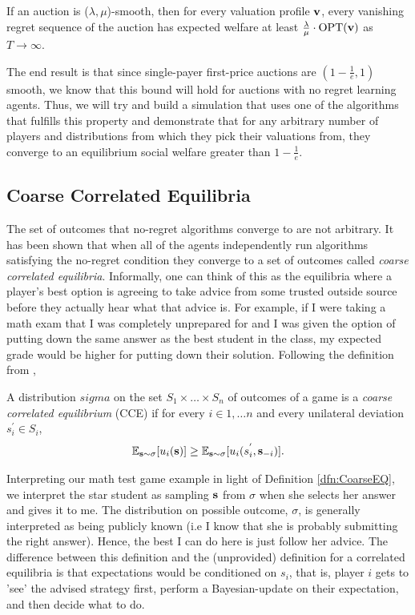\documentclass[12pt,twoside]{reedthesis}
\begin{document}
\begin{theorem}
	If an auction is ($\lambda, \mu$)-smooth, then for every valuation profile $\textbf{v}$, every vanishing regret sequence of the auction has expected welfare at least $\frac{\lambda}{\mu} \cdot \text{OPT}(\textbf{v})$ as $T \rightarrow \infty$. 
\end{theorem}

The end result is that since single-payer first-price auctions are $(1-\frac{1}{e}, 1)$ smooth, we know that this bound will hold for auctions with no regret learning agents. Thus, we will try and build a simulation that uses one of the algorithms that fulfills this property and demonstrate that for any arbitrary number of players and distributions from which they pick their valuations from, they converge to an equilibrium social welfare greater than $1-\frac{1}{e}$.

\label{sec:No-Regret-Learning}
\subsection{Coarse Correlated Equilibria}
The set of outcomes that no-regret algorithms converge to are not arbitrary. It has been shown that when all of the agents independently run algorithms satisfying the no-regret condition they converge to a set of outcomes called {\em coarse correlated equilibria}. Informally, one can think of this as the equilibria where a player's best option is agreeing to take advice from some trusted outside source before they actually hear what that advice is. For example, if I were taking a math exam that I was completely unprepared for and I was given the option of putting down the same answer as the best student in the class, my expected grade would be higher for putting down their solution. Following the definition from \cite{Roughgarden2016},
\begin{dfn}
	A distribution $sigma$ on the set $S_1 \times \ldots \times S_n$ of outcomes of a game is a {\em coarse correlated equilibrium} (CCE) if for every $i \in {1, \ldots n}$ and every unilateral deviation $s_i^{'} \in S_i$,
	$$\mathbb{E}_{\textbf{s} \sim \sigma}[u_i(\textbf{s})] \geq \mathbb{E}_{\textbf{s} \sim \sigma}[u_i(s_i^{'}, \textbf{s}_{-i})].$$
	\label{dfn:CoarseEQ}
\end{dfn}

Interpreting our math test game example in light of Definition \ref{dfn:CoarseEQ}, we interpret the star student as sampling $\textbf{s}$ from $\sigma$ when she selects her answer and gives it to me. The distribution on possible outcome, $\sigma$, is generally interpreted as being publicly known (i.e I know that she is probably submitting the right answer). Hence, the best I can do here is just follow her advice. The difference between this definition and the (unprovided) definition for a correlated equilibria is that expectations would be conditioned on $s_i$, that is, player $i$ gets to 'see' the advised strategy first, perform a Bayesian-update on their expectation, and then decide what to do. 
\end{document}
